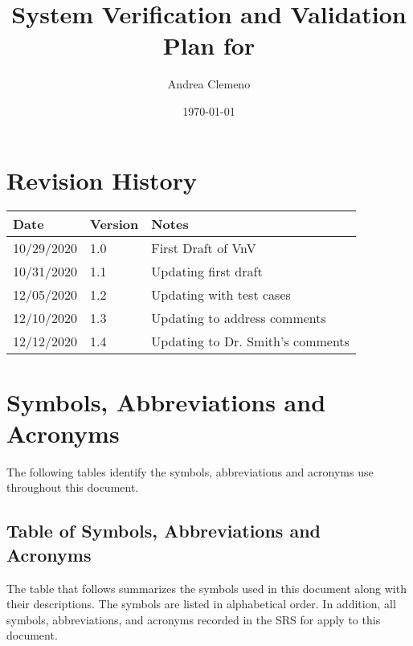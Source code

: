 \documentclass[12pt, titlepage]{article}
\begin{document}
\title{System Verification and Validation 
Plan for \progname{}} 
\author{Andrea Clemeno}
\date{\today}
	
\maketitle


\section{Revision History}

\begin{tabularx}{\textwidth}{p{3cm}p{2cm}X}
\toprule {\bf Date} & {\bf Version} & {\bf Notes}\\
\midrule
10/29/2020  & 1.0 & First Draft of VnV\\
10/31/2020  & 1.1 & Updating first draft\\
12/05/2020  & 1.2 & Updating with test cases\\
12/10/2020  & 1.3 & Updating to address comments\\
12/12/2020  & 1.4 & Updating to Dr. Smith's comments\\
\bottomrule
\end{tabularx}


\newpage

\tableofcontents
\newpage
\listoftables
\newpage

\newpage

\section{Symbols, Abbreviations and Acronyms}

The following tables identify the symbols, abbreviations and acronyms use 
throughout this document.
  
\subsection{Table of Symbols, Abbreviations and Acronyms}

The table that follows summarizes the symbols used in this document along with
their descriptions. The symbols are listed in alphabetical order. In addition, 
all symbols, abbreviations, and acronyms recorded in the SRS for \progname{} 
\citep{SRS} apply to this document.
\end{document}
